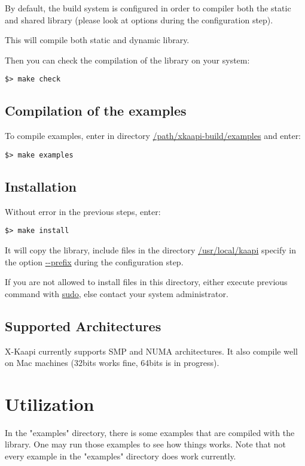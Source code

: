\documentclass{article}
\newcommand{\kaapi}{\textsc{X}-Kaapi\xspace}
\begin{document}
By default, the build system is configured in order to compiler both the static and shared library (please look at options during the configuration step).

This will compile both static and dynamic library. 

Then you can check the compilation of the library on your system:
\begin{verbatim}
$> make check
\end{verbatim}

\subsection{Compilation of the examples}
To compile examples, enter in directory \url{/path/xkaapi-build/examples} and enter:
\begin{verbatim}
$> make examples
\end{verbatim}

\subsection{Installation}
Without error in the previous steps, enter:
\begin{verbatim}
$> make install
\end{verbatim}
It will copy the library, include files in the directory \url{/usr/local/kaapi} specify in the option \url{--prefix} during the
configuration step.

If you are not allowed to install files in this directory, either execute previous command with \url{sudo}, else
contact your system administrator.

\subsection{Supported Architectures}

\kaapi currently supports SMP and NUMA architectures. It also compile well on Mac machines (32bits works fine, 64bits is in progress).

\section{Utilization}

In the "examples" directory, there is some examples that are compiled with the library. One may run those examples to see how things works.
Note that not every example in the "examples" directory does work currently.
\end{document}

